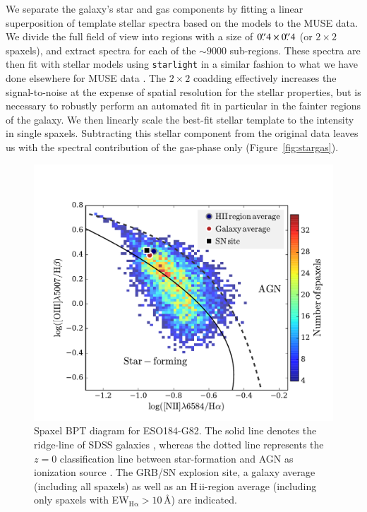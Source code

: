 \documentclass[traditabstract]{aa}
\newcommand{\farc}{\hbox{$.\!\!^{\prime\prime}$}}
\newcommand{\hii}{\mbox{H\,{\sc ii}}}
\begin{document}
We separate the galaxy's star and gas components by fitting a linear superposition of template stellar spectra based on the \citet{2003MNRAS.344.1000B} models to the MUSE data. We divide the full field of view into regions with a size of $0\farc{4}\times0\farc{4}$ (or $2 \times 2$ spaxels), and extract spectra for each of the $\sim9000$ sub-regions. These spectra are then fit with stellar models using \texttt{starlight} \citep{2005MNRAS.358..363C, 2009RMxAC..35..127C} in a similar fashion to what we have done elsewhere for MUSE data \citep{2016MNRAS.455.4087G, 2016arXiv160703446K, 2016arXiv160900013P}. The $2\times2$ coadding effectively increases the signal-to-noise at the expense of spatial resolution for the stellar properties, but is necessary to robustly perform an automated fit in particular in the fainter regions of the galaxy. We then linearly scale the best-fit stellar template to the intensity in single spaxels. Subtracting this stellar component from the original data leaves us with the spectral contribution of the gas-phase only (Figure~\ref{fig:stargas}).

\begin{figure}
\begin{center}
  \includegraphics[width=0.75\linewidth]{Figs/MUSE_SN1998bw_BPT.pdf}
\caption{Spaxel BPT diagram for ESO184-G82. The solid line denotes the ridge-line of SDSS galaxies \citep{2008MNRAS.385..769B}, whereas the dotted line represents the $z=0$ classification line between star-formation and AGN as ionization source \citep{2013ApJ...774..100K}. The GRB/SN explosion site, a galaxy average (including all spaxels) as well as an \hii-region average (including only spaxels with EW$_{\mathrm{H\alpha}}>10$\,\AA) are indicated.}
\label{fig:BPT}
\end{center}
\end{figure}
\end{document}
